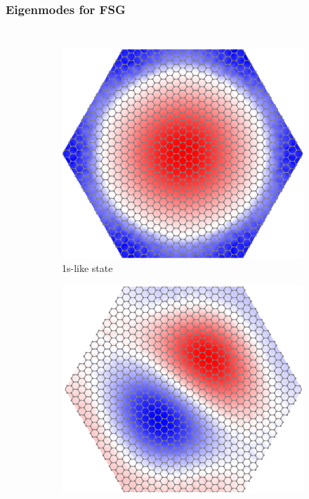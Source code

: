 \documentclass{beamer}
\begin{document}
\begin{frame}
\frametitle{Eigenmodes for FSG}
\begin{columns}
\begin{figure}[H]
      \begin{subfigure}[b]{0.45\textwidth}
        \centering
        \includegraphics[width=\textwidth]{img/eigenmode_1s.pdf} 
        \caption{1s-like state}
        \vspace{-1ex}
      \end{subfigure}
      \begin{subfigure}[b]{0.45\textwidth}
        \centering
        \includegraphics[width=\textwidth]{img/eigenmode_1p.pdf}

\end{subfigure}
\end{figure}
\end{columns}
\end{frame}
\end{document}
